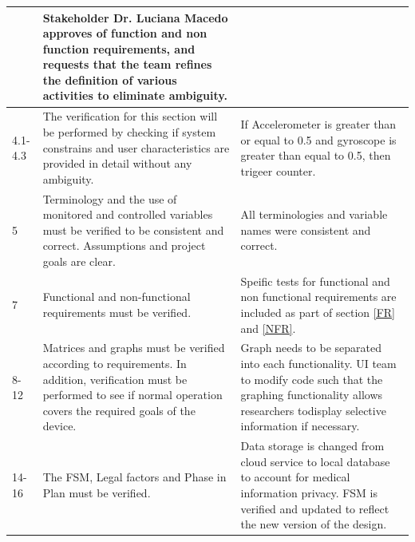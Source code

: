\documentclass[12pt, titlepage]{article}
\begin{document}
\begin{center}
\begin{table} [H]
\begin{tabular}{|p{1.5cm}|p{6.5cm}|p{6.9cm}|}
 & Stakeholder Dr. Luciana Macedo approves of function and non function requirements, and requests that the team refines the definition of various activities to eliminate ambiguity. \\
    \hline
    4.1-4.3  & The verification for this section will be performed by checking if system constrains and user characteristics are provided in detail without any ambiguity.                                       &  If Accelerometer is greater than or equal to 0.5 and gyroscope is greater than equal to 0.5, then trigeer counter.\\
    \hline
    5 &  Terminology and the use of monitored and controlled variables must be verified to be consistent and correct. Assumptions and project goals are clear. & All terminologies and variable names were consistent and correct.                                           \\
    \hline
    7 & Functional and non-functional requirements must be verified.                           & Speific tests for functional and non functional requirements are included as part of section \ref{FR} and \ref{NFR}.                                                \\
    \hline
8-12&  Matrices and graphs must be verified according to requirements. In addition, verification must be performed to see if normal operation covers the required goals of the device.                                         & Graph needs to be separated into each functionality. UI team to modify code such that the graphing functionality allows researchers todisplay selective information if necessary.                                             \\
    \hline
14-16                                           & The FSM, Legal factors and Phase in Plan must be verified.                                                                                                                                 & Data storage is changed from cloud service to local database to account for medical information privacy. FSM is verified and updated to reflect the new version of the design.\\
    \hline
  \end{tabular}
\end{table}
\end{center}
\end{document}
